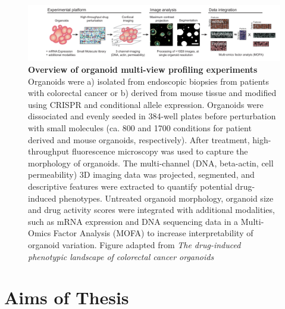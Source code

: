 \begin{flushleft}
\begin{figure}[h]
\centering
\includegraphics[width=\textwidth,
                height=\textheight,
                keepaspectratio]{figures/promise/pdf/fig_1_1_1.pdf}
\caption[Overview of organoid multi-view profiling experiments]{\textbf{Overview of organoid multi-view profiling experiments} Organoids were a) isolated from endoscopic biopsies from patients with colorectal cancer or b) derived from mouse tissue and modified using CRISPR and conditional allele expression. Organoids were dissociated and evenly seeded in 384-well plates before perturbation with small molecules (ca. 800 and 1700 conditions for patient derived and mouse organoids, respectively). After treatment, high-throughput fluorescence microscopy was used to capture the morphology of organoids.  The multi-channel (DNA, beta-actin, cell permeability) 3D imaging data was projected, segmented, and descriptive features were extracted to quantify potential drug-induced phenotypes. Untreated organoid morphology, organoid size and drug activity scores were integrated with additional modalities, such as mRNA expression and DNA sequencing data in a Multi-Omics Factor Analysis (MOFA) to increase interpretability of organoid variation. Figure adapted from \textit{The drug-induced phenotypic landscape of colorectal cancer organoids} \citep{betgeDruginducedPhenotypicLandscape2022}}
\label{fig_130}
\end{figure}

\newpage
\section{Aims of Thesis}


\end{flushleft}
